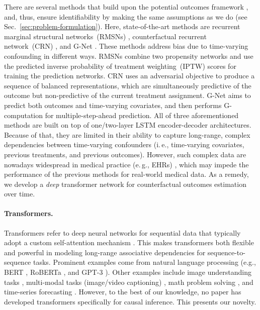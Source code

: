 \documentclass{article}
\newcommand\ie{i.\,e.\xspace}
\newcommand\eg{e.\,g.\xspace}
\theoremstyle{plain}
\theoremstyle{definition}
\theoremstyle{remark}
\begin{document}
There are several methods that build upon the potential outcomes framework \cite{rubin1978bayesian,robins2009estimation}, and, thus, ensure identifiability by making the same assumptions as we do (see Sec.~\ref{sec:problem-formulation}). Here, state-of-the-art methods are recurrent marginal structural networks~(RMSNs) \cite{lim2018forecasting}, counterfactual recurrent network~(CRN) \cite{bica2020estimating}, and G-Net \cite{li2021g}. These methods address bias due to time-varying confounding in different ways. RMSNs combine two propensity networks and use the predicted inverse probability of treatment weighting~(IPTW) scores for training the prediction networks. CRN uses an adversarial objective to produce a sequence of balanced representations, which are simultaneously predictive of the outcome but non-predictive of the current treatment assignment. G-Net aims to predict both outcomes and time-varying covariates, and then performs G-computation for multiple-step-ahead prediction. All of three aforementioned methods are built on top of one/two-layer LSTM encoder-decoder architectures. Because of that, they are limited in their ability to capture long-range, complex dependencies between time-varying confounders (\ie, time-varying covariates, previous treatments, and previous outcomes). However, such complex data are nowadays widespread in medical practice (\eg, EHRs) \cite{allam2021analyzing}, which may impede the performance of the previous methods for real-world medical data. As a remedy, we develop a \emph{deep} transformer network for counterfactual outcomes estimation over time. 


\paragraph{Transformers.} Transformers refer to deep neural networks for sequential data that typically adopt a custom self-attention mechanism \cite{vaswani2017attention}. This makes transformers both flexible and powerful in modeling long-range associative dependencies for sequence-to-sequence tasks. Prominent examples come from natural language processing (e.g., BERT \cite{devlin2019bert}, RoBERTa \cite{liu2019roberta}, and GPT-3 \cite{brown2020language}). Other examples include image understanding tasks \cite{dosovitskiy2020image}, multi-modal tasks (image/video captioning) \cite{liu2021cptr}, math problem solving \cite{schlag2019enhancing}, and time-series forecasting \cite{tang2021probabilistic,zhou2021informer}. However, to the best of our knowledge, no paper has developed transformers specifically for causal inference. This presents our novelty.  
\end{document}

